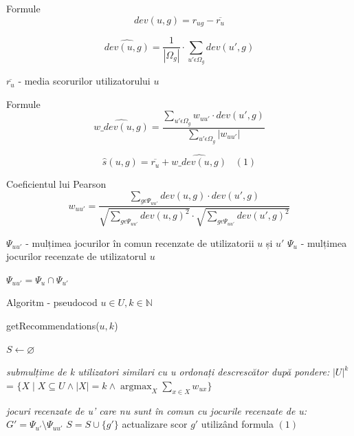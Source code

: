 \documentclass{beamer}
\DeclareMathOperator*{\argmax}{argmax}
\begin{document}
\begin{frame}{Formule}
    \[ dev(u,g) = r_{ug} - \overline{r_{u}} \]
    
    \[ \hat{dev(u,g)} = \frac{1}{|\Omega_{g}|} \cdot \sum\limits_{u' \epsilon \Omega_{g} } dev(u', g) \] 
    
    \( \overline{r_{u}}\) - media scorurilor utilizatorului \( u \)
    
\end{frame}

\begin{frame}{Formule}
    \[ \hat{w\_dev(u,g)} = \dfrac{ \sum\limits_{u' \epsilon \Omega_{g} } w_{uu'} \cdot dev(u', g) }{\sum\limits_{u' \epsilon \Omega_{g}} |w_{uu'}|} \]
    
    \[  \hat{s}(u,g) = \overline{r_u} + \hat{w\_dev(u,g)} \;\;\; (1)  \]
\end{frame}

\begin{frame}{Coeficientul lui Pearson}
\[ w_{uu'} = \dfrac{ \sum\limits_{g \epsilon \Psi_{uu'} } dev(u, g) \cdot dev(u', g) }{
\sqrt{\sum\limits_{g \epsilon \Psi_{uu'} } dev(u, g)^2} \cdot \sqrt{\sum\limits_{g \epsilon \Psi_{uu'} } dev(u', g)^2} }\]

\( \Psi_{uu'}\) - mulțimea jocurilor în comun recenzate de utilizatorii \( u \) și \( u' \)
\( \Psi_{u}\) - mulțimea jocurilor recenzate de utilizatorul \( u \)

\( \Psi_{uu'} = \Psi_{u} \cap \Psi_{u'} \) 

    
\end{frame}

\begin{frame}[fragile]{Algoritm - pseudocod}
    \( u \in U, k \in \mathbb{N} \)
    
    getRecommendations(\(u, k \))
    \begin{algorithmic}
\State $S \gets \varnothing $

\State \textit{ submulțime de k utilizatori similari cu u ordonați descrescător după pondere:}
\State \( |U|^k \) = \( \{ X  \; | \; X \subseteq U \land |X| = k \land \argmax_{X} \sum_{x \in X} w_{ux}  \} \)

    \State \textit{jocuri recenzate de u' care nu sunt în comun cu jocurile recenzate de u:}
    \State \( G' = \Psi_{u'} \setminus \Psi_{uu'}  \)
        \State \( S = S \cup \{ g' \}\)
        \State actualizare scor \( g' \) utilizând formula \( (1) \)

    \EndFor

\EndFor

\end{algorithmic}
\end{frame}
\end{document}
